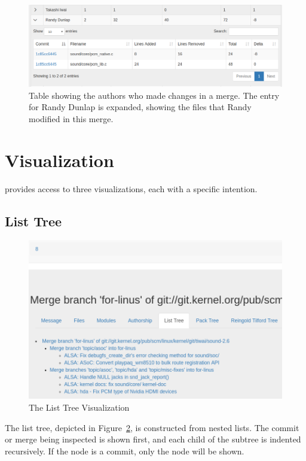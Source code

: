 \begin{figure}[htpb]
  \centering
  \includegraphics[width=0.9\linewidth]{Figures/Linvis/linvis_authors.png}
  \caption{Table showing the authors who made changes in a merge. The
    entry for Randy Dunlap is expanded, showing the files that Randy
    modified in this merge.}
  \label{fig:linvis_authors_results}
\end{figure}

\section{Visualization}\label{sec:visualization}

\tool{} provides access to three visualizations, each with a specific
intention.

\subsection{List Tree}\label{sub:list_tree}

\begin{figure}[htpb]
  \centering
  \includegraphics[width=0.9\linewidth]{Figures/Linvis/linvis_list_tree.png}
  \caption{The List Tree Visualization}
  \label{fig:linvis_list_tree}
\end{figure}

The list tree, depicted in Figure~\ref{fig:linvis_list_tree}, is
constructed from nested lists.
The commit or merge being inspected is shown first, and each child of
the subtree is indented recursively.
If the node is a commit, only the node will be shown.

